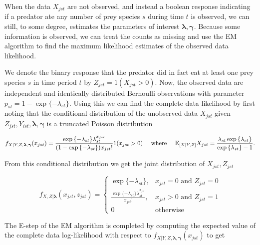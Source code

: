 When the data $X_{jst}$ are not observed, and instead a boolean response indicating if a predator ate any number of prey species $s$ during time $t$ is observed, we can still, to some degree, estimates the parameters of interest $\boldsymbol{\lambda}, \boldsymbol{\gamma}$.  Because some information is observed, we can treat the counts as missing and use the EM algorithm to find the maximum likelihood estimates of the observed data likelihood.  

We denote the binary response that the predator did in fact eat at least one prey species $s$ in time period $t$ by $Z_{jst} = 1(X_{jst} > 0)$.  Now, the observed data are independent and identically distributed Bernoulli observations with parameter $p_{st} = 1-\exp\{-\lambda_{st}\}$.  Using this we can find the complete data likelihood by first noting that the conditional distribution of the unobserved data $X_{jst}$ given $Z_{jst}, Y_{ist}, \boldsymbol{\lambda}, \boldsymbol{\gamma}$ is a truncated Poisson distribution

\begin{equation*}
  f_{X|Y,Z,\boldsymbol{\lambda},\boldsymbol{\gamma}}(x_{jst}) =
  \frac{\exp{\{-\lambda_{st}\}} \lambda_{st}^{x_{jst}}}{(1 - \exp{\{-\lambda_{st}\}}) x_{jst}!}1(x_{jst} > 0) \quad \text{ where } \quad \mathbb{E}_{[X|Y,Z]}X_{jst} = \frac{\lambda_{st} \exp{\{\lambda_{st} \}}}{\exp{\{ \lambda_{st} \}} - 1}.
\end{equation*}

\noindent From this conditional distribution we get the joint distribution of $X_{jst}, Z_{jst}$

\begin{equation*}
    f_{X,Z|\boldsymbol{\lambda}}(x_{jst},z_{jst}) = \left\{
    \begin{array}{lr}
      \exp{\{ -\lambda_{st} \}}, & x_{jst}=0 \mbox{ and } Z_{jst} = 0 \\
      \frac{\exp{\{-\lambda_{st} \}} \lambda_{st}^{x_{jst}}}{x_{jst}!}, & x_{jst} > 0 \mbox{ and } Z_{jst} = 1\\
      0 & \mbox{otherwise}
    \end{array}
  \right.
\end{equation*}

\noindent The E-step of the EM algorithm is completed by computing the expected value of the complete data log-likelihood with respect to $f_{X|Y,Z,\boldsymbol{\lambda},\boldsymbol{\gamma}}(x_{jst})$ to get

